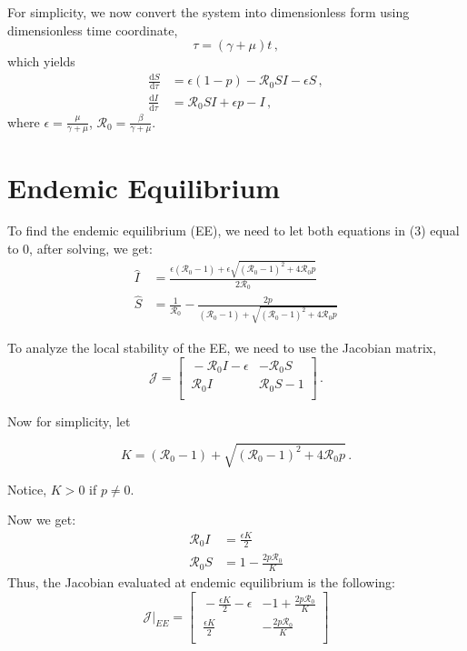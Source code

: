 \documentclass[12pt]{article}
\newcommand\dbyd[2]{\frac{\mathrm d{#1}}{\mathrm d{#2}}}
\newcommand{\R}{\mathcal{R}}
\begin{document}
For simplicity, we now convert the system into dimensionless form using dimensionless time coordinate,
\begin{equation}
\tau=(\gamma+\mu)t \,,
\end{equation}
which yields
\begin{subequations}
\begin{align}
\dbyd{S}{\tau}&=\epsilon(1-p)- \R_0  SI-\epsilon S \,,\\
\dbyd{I}{\tau}&=\R_0 SI+\epsilon p-I \,,
\end{align}
\end{subequations}
where $\epsilon=\frac{\mu}{\gamma+\mu}$, $\R_0=\frac{\beta}{\gamma+\mu}$.

\section{Endemic Equilibrium}

To find the endemic equilibrium (EE), we need to let both equations in (3) equal to 0, after solving, we get:
\begin{align}
\hat{I} &= \frac{\epsilon(\R_0 -1)+ \epsilon \sqrt{(\R_0-1)^2+4\R_0
    p}}{2\R_0} \\
\hat{S} &=\frac{1}{\R_0}-\frac{2p}{(\R_0 -1)+ \sqrt{(\R_0-1)^2+4\R_0 p}} 
\end{align}

To analyze the local stability of the EE, we need to use the Jacobian matrix,
\begin{equation}
\mathcal{J} =
\begin{bmatrix}
    \ -\R_0 I-\epsilon       & -\R_0 S \\
    \ \R_0 I       & \R_0 S-1 \\
\end{bmatrix} \,.
\end{equation}

Now for simplicity, let 
%
\begin{linenomath*}
\begin{equation}\label{E:}
K = (\R_0 -1)+ \sqrt{(\R_0-1)^2+4\R_0 p} \,.
\end{equation}
\end{linenomath*}
%
Notice, $K>0$ if $p\neq 0$.

Now we get:
\begin{align}
\R_0 I &= \frac{\epsilon K}{2}\\
\R_0 S &= 1-\frac{2p \R_0}{K}
\end{align}
Thus, the Jacobian evaluated at endemic equilibrium is the following:
\begin{equation}
\mathcal{J}|_{EE} =
\begin{bmatrix}
    \ -\frac{\epsilon K}{2}-\epsilon       & -1+\frac{2p \R_0}{K} \\
    \ \frac{\epsilon K}{2}       & -\frac{2p \R_0}{K} \\
\end{bmatrix}
\end{equation}
\end{document}

